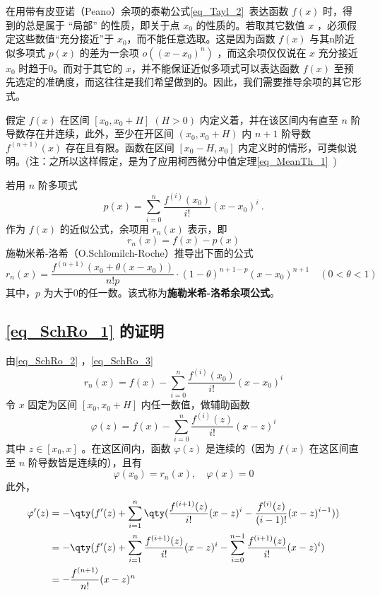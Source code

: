 
在用带有皮亚诺（Peano）余项的泰勒公式\autoref{eq_Tayl_2}~表达函数 $f(x)$ 时，得到的总是属于 “局部” 的性质，即关于点 $x_0$ 的性质的。若取其它数值 $x$ ，必须假定这些数值“充分接近”于 $x_0$，而不能任意选取。这是因为函数 $f(x)$ 与其n阶近似多项式 $p(x)$ 的差为一余项 $o((x-x_0)^n)$ ，而这余项仅仅说在 $x$ 充分接近 $x_0$ 时趋于0。而对于其它的 $x$，并不能保证近似多项式可以表达函数 $f(x)$ 至预先选定的准确度，而这往往是我们希望做到的。因此，我们需要推导余项的其它形式。

假定 $f(x)$ 在区间 $[x_0,x_0+H]\;(H>0)$ 内定义着，并在该区间内有直至 $n$ 阶导数存在并连续，此外，至少在开区间 $(x_0,x_0+H)$ 内 $n+1$ 阶导数 $f^{(n+1)}(x)$ 存在且有限。函数在区间 $[x_0-H,x_0]$ 内定义时的情形，可类似说明。(注：之所以这样假定，是为了应用柯西微分中值定理\autoref{eq_MeanTh_1}~)

若用 $n$ 阶多项式
\begin{equation}\label{eq_SchRo_2}
p(x)=\sum_{i=0}^n\frac{f^{(i)}(x_0)}{i!}(x-x_0)^i~.
\end{equation}
作为 $f(x)$ 的近似公式，余项用 $r_n(x)$ 表示，即 
\begin{equation}\label{eq_SchRo_3}
r_n(x)=f(x)-p(x)
\end{equation}
施勒米希-洛希（O.Schl$\ddot{o}$milch-Roche）推导出下面的公式
\begin{equation}\label{eq_SchRo_1}
r_n(x)=\frac{f^{(n+1)}(x_0+\theta(x-x_0))}{n!p}\cdot(1-\theta)^{n+1-p}(x-x_0)^{n+1}\quad (0<\theta<1)
\end{equation}
其中，$p$ 为大于0的任一数。该式称为\textbf{施勒米希-洛希余项公式}。
\subsection{\autoref{eq_SchRo_1} 的证明}
由\autoref{eq_SchRo_2} ，\autoref{eq_SchRo_3} 
\begin{equation}
r_n(x)=f(x)-\sum_{i=0}^n\frac{f^{(i)}(x_0)}{i!}(x-x_0)^i
\end{equation}
令 $x$ 固定为区间 $[x_0,x_0+H]$ 内任一数值，做辅助函数
\begin{equation}
\varphi(z)=f(x)-\sum_{i=0}^n\frac{f^{(i)}(z)}{i!}(x-z)^i
\end{equation}
其中 $z\in[x_0,x]$ 。在这区间内，函数 $\varphi(z)$ 是连续的（因为 $f(x)$ 在这区间直至 $n$ 阶导数皆是连续的），且有
\begin{equation}\label{eq_SchRo_4}
\varphi(x_0)=r_n(x),\quad \varphi(x)=0
\end{equation}
此外，
\begin{equation}\label{eq_SchRo_6}
\begin{aligned}
\varphi'(z)&=-\qty(f'(z)+\sum_{i=1}^n\qty(\frac{f^{(i+1)}(z)}{i!}(x-z)^i-\frac{f^{(i)}(z)}{(i-1)!}(x-z)^{i-1}))\\
&=-\qty(f'(z)+\sum_{i=1}^n\frac{f^{(i+1)}(z)}{i!}(x-z)^i-\sum_{i=0}^{n-1}\frac{f^{(i+1)}(z)}{i!}(x-z)^{i})\\
&=-\frac{f^{(n+1)}}{n!}(x-z)^{n}
\end{aligned}
\end{equation}

